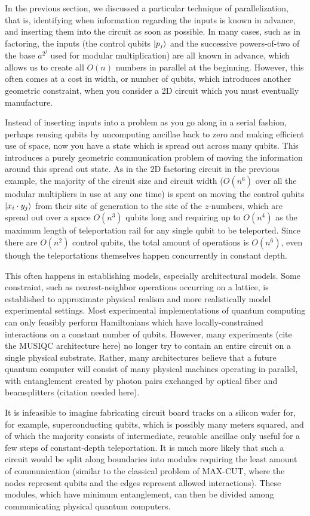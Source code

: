 \documentclass{article}
\begin{document}
In the previous section, we discussed a particular technique of parallelization,
that is, identifying when information regarding the inputs is known in advance,
and inserting them into the circuit as soon as possible. In many cases, such
as in factoring, the inputs (the control qubits $\left\vert{p_j}\right\rangle$
and the successive powers-of-two of the base $a^{2^j}$ used for
modular multiplication) are all known in advance, which allows us to create
all $O(n)$ numbers in parallel at the beginning. However, this often comes at
a cost in width, or number of qubits, which introduces another geometric
constraint, when you consider a 2D circuit which you must eventually
manufacture.

Instead of inserting inputs into a problem as you go along in a serial fashion,
perhaps reusing qubits by uncomputing ancillae back to zero and making
efficient use of space, now you have a state which is spread out across
many qubits. This introduces a purely geometric communication problem of
moving the information around this spread out state. As in the 2D factoring
circuit in the previous example, the majority of the circuit size and circuit
width ($O(n^6)$ over all the modular multipliers in use at any one time) is
spent on moving the control qubits $\left\vert{x_i \cdot y_j}\right\rangle$ from their site of
generation to the site of the $z$-numbers, which are spread out over a
space $O(n^3)$ qubits long and requiring up to $O(n^4)$ as the maximum length
of teleportation rail for any single qubit to be teleported.
Since there are $O(n^2)$ control qubits, the total amount of operations
is $O(n^6)$, even though the teleportations themselves happen concurrently
in constant depth.

This often happens in establishing models, especially architectural models.
Some constraint, such as nearest-neighbor operations occurring on a lattice,
is established to approximate physical realism and more realistically
model experimental settings. Most experimental implementations of quantum
computing can only feasibly perform Hamiltonians which have locally-constrained
interactions on a constant number of qubits. However, many experiments
(cite the MUSIQC architecture here) no longer try to contain an entire
circuit on a single physical substrate. Rather, many architectures believe that
a future quantum computer will consist of many physical machines operating in
parallel, with entanglement created by photon pairs exchanged by optical fiber
and beamsplitters (citation needed here).

It is infeasible to imagine fabricating circuit board tracks on a silicon wafer
for, for example, superconducting qubits, which is possibly many meters squared,
and of which the majority consists of intermediate, reusable ancillae only
useful for a few steps of constant-depth teleportation. It is much more likely
that such a circuit would be split along boundaries into modules requiring the least
amount of communication (similar to the classical problem of MAX-CUT, where
the nodes represent qubits and the edges represent allowed interactions).
These modules, which have minimum entanglement, can then be divided among
communicating physical quantum computers.
\end{document}

